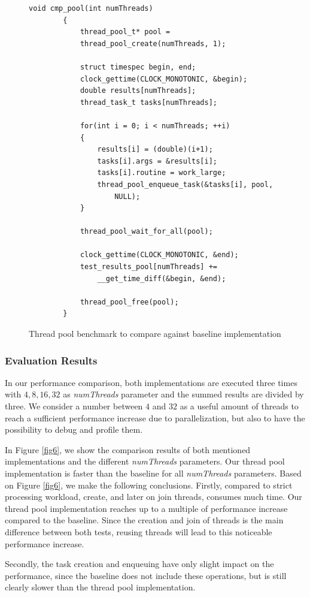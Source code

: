 \documentclass[conference]{IEEEtran}
\begin{document}
\begin{figure}
	\begin{lstlisting}[style=CStyle]
		void cmp_pool(int numThreads)
		{
			thread_pool_t* pool = 
			thread_pool_create(numThreads, 1);
			
			struct timespec begin, end;
			clock_gettime(CLOCK_MONOTONIC, &begin);
			double results[numThreads];
			thread_task_t tasks[numThreads];
			
			for(int i = 0; i < numThreads; ++i)
			{
				results[i] = (double)(i+1);
				tasks[i].args = &results[i];
				tasks[i].routine = work_large;
				thread_pool_enqueue_task(&tasks[i], pool, 
					NULL);
			}
			
			thread_pool_wait_for_all(pool);
			
			clock_gettime(CLOCK_MONOTONIC, &end);
			test_results_pool[numThreads] += 
				__get_time_diff(&begin, &end);
			
			thread_pool_free(pool);
		}
	\end{lstlisting}
	\caption{Thread pool benchmark to compare against baseline implementation}
	\label{fig5}
\end{figure}

\subsubsection{Evaluation Results}
In our performance comparison, both implementations are executed three times with $4, 8, 16, 32$ as \emph{numThreads} parameter and the summed results are divided by three. We consider a number between $4$ and $32$ as a useful amount of threads to reach a sufficient performance increase due to parallelization, but also to have the possibility to debug and profile them. 

In Figure \ref{fig6}, we show the comparison results of both mentioned implementations and the different \emph{numThreads} parameters. Our thread pool implementation is faster than the baseline for all \emph{numThreads} parameters. Based on Figure \ref{fig6}, we make the following conclusions.  
Firstly, compared to strict processing workload, create, and later on join threads, consumes much time. Our thread pool implementation reaches up to a multiple of performance increase compared to the baseline. Since the creation and join of threads is the main difference between both tests, reusing threads will lead to this noticeable performance increase. 

Secondly, the task creation and enqueuing have only slight impact on the performance, since the baseline does not include these operations, but is still clearly slower than the thread pool implementation. 
\end{document}
